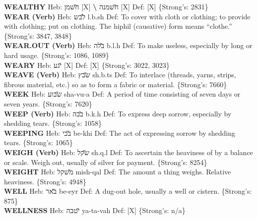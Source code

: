 {\textbf{WEALTHY} Heb: {\large\H חשמן} {[}X{]} \textbf{\textbackslash{}} {\large\H חשמנה} {[}X{]} Def: {[}X{]} \{Strong's: 2831\}\hfill{}\\

\textbf{WEAR (Verb)} Heb: {\large\H לבש} l.b.sh Def: To cover with cloth or clothing; to provide with clothing; put on clothing. The hiphil (causative) form means ``clothe.'' \{Strong's: 3847, 3848\}\hfill{}\\

\textbf{WEAR.OUT (Verb)} Heb: {\large\H בלה} b.l.h Def: To make useless, especially by long or hard usage. \{Strong's: 1086, 1089\}\hfill{}\\

\textbf{WEARY} Heb: {\large\H יגע} {[}X{]} Def: {[}X{]} \{Strong's: 3022, 3023\}\hfill{}\\

\textbf{WEAVE (Verb)} Heb: {\large\H שבץ} sh.b.ts Def: To interlace (threads, yarns, strips, fibrous material, etc.) so as to form a fabric or material. \{Strong's: 7660\}\hfill{}\\

\textbf{WEEK} Heb: {\large\H שבוע} sha-vu-a Def: A period of time consisting of seven days or seven years. \{Strong's: 7620\}\hfill{}\\

\textbf{WEEP (Verb)} Heb: {\large\H בכה} b.k.h Def: To express deep sorrow, especially by shedding tears. \{Strong's: 1058\}\hfill{}\\

\textbf{WEEPING} Heb: {\large\H בכי} be-khi Def: The act of expressing sorrow by shedding tears. \{Strong's: 1065\}\hfill{}\\

\textbf{WEIGH (Verb)} Heb: {\large\H שקל} sh.q.l Def: To ascertain the heaviness of by a balance or scale. Weigh out, usually of silver for payment. \{Strong's: 8254\}\hfill{}\\

\textbf{WEIGHT} Heb: {\large\H משקל} mish-qal Def: The amount a thing weighs. Relative heaviness. \{Strong's: 4948\}\hfill{}\\

\textbf{WELL} Heb: {\large\H באר} be-eyr Def: A dug-out hole, usually a well or cistern. \{Strong's: 875\}\hfill{}\\

\textbf{WELLNESS} Heb: {\large\H יטבה} ya-ta-vah Def: {[}X{]} \{Strong's: n/a\}\hfill{}\\

}
